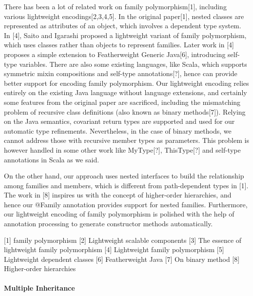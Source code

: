 There has been a lot of related work on family polymorphism[1], including various lightweight encodings[2,3,4,5]. In the original
paper[1], nested classes are represented as attributes of an object, which involves a dependent type system. In [4], Saito and Igarashi
proposed a lightweight variant of family polymorphism, which uses classes rather than objects to represent families. Later work in [4]
proposes a simple extension to Featherweight Generic Java[6], introducing self-type variables. There are also some existing languages,
like Scala, which supports symmetric mixin compositions and self-type annotations[?], hence can provide better support for encoding family
polymorphism. Our lightweight encoding relies entirely on the existing Java language without language extensions, and certainly some features from
the original paper are sacrificed, including the mismatching problem of recursive class definitions (also known as binary methods[7]). Relying
on the Java semantics, covariant return types are supported and used for our automatic type refinements. Nevertheless, in the case of binary methods,
we cannot address those with recursive member types as parameters. This problem is however handled in some other work like MyType[?], ThisType[?] and self-type
annotations in Scala as we said.

On the other hand, our approach uses nested interfaces to build the relationship among families and members, which is different from
path-dependent types in [1]. The work in [8] inspires us with the concept of higher-order hierarchies, and hence our \textsf{@Family} annotation
provides support for nested families. Furthermore, our lightweight encoding of family polymorphism is polished with the help of annotation processing
to generate constructor methods automatically.

[1] family polymorphism
[2] Lightweight scalable components
[3] The essence of lightweight family polymorphism
[4] Lightweight family polymorphism
[5] Lightweight dependent classes
[6] Featherweight Java
[7] On binary method
[8] Higher-order hierarchies


\paragraph{Multiple Inheritance}

